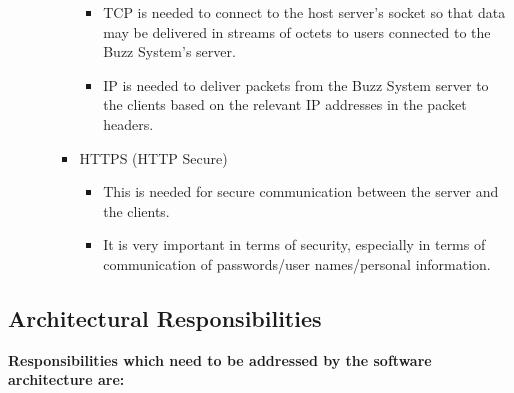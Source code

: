 \documentclass[11pt]{article}
\begin{document}
\begin{itemize}
\begin{itemize}
\begin{itemize}
\begin{itemize}
							\item TCP is needed to connect to the host server's socket so that data may be delivered in streams of octets to users connected to the Buzz System's server.
							\item IP is needed to deliver packets from the Buzz System server to the clients based on the relevant IP addresses in the packet headers.
						\end{itemize}
					\item HTTPS (HTTP Secure)
						\begin{itemize}
							\item This is needed for secure communication between the server and the clients. 
							\item It is very important in terms of security, especially in terms of communication of passwords/user names/personal information.
						\end{itemize}
				\end{itemize}
		\end{itemize}
	\end{itemize}

	\newpage
	\begin{center}
	\section{\textbf{\huge{Architectural Responsibilities}}}
	\end{center}
	
	\textbf{Responsibilities which need to be addressed by the software architecture are:}
	\\
	
\end{document}
